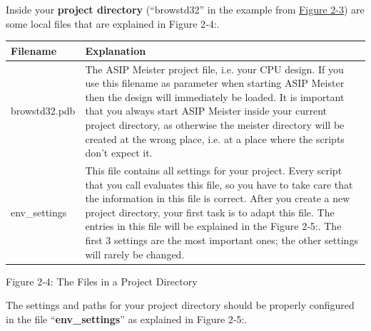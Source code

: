\documentclass[
]{article}
\begin{document}
Inside your \textbf{project directory} (``browstd32'' in the example
from \protect\hyperlink{Fig23}{Figure 2-3}) are some local files that
are explained in Figure 2‑4:.

\begin{longtable}[]{@{}ll@{}}
\toprule
\textbf{Filename} & \textbf{Explanation}\tabularnewline
\midrule
\endhead
browstd32.pdb & The ASIP Meister project file, i.e. your CPU design. If
you use this filename as parameter when starting ASIP Meister then the
design will immediately be loaded. It is important that you always start
ASIP Meister inside your current project directory, as otherwise the
meister directory will be created at the wrong place, i.e. at a place
where the scripts don't expect it.\tabularnewline
env\_settings & This file contains all settings for your project. Every
script that you call evaluates this file, so you have to take care that
the information in this file is correct. After you create a new project
directory, your first task is to adapt this file. The entries in this
file will be explained in the Figure 2‑5:. The first 3 settings are the
most important ones; the other settings will rarely be
changed.\tabularnewline
\bottomrule
\end{longtable}

Figure 2‑4: The Files in a Project Directory

The settings and paths for your project directory should be properly
configured in the file ``\textbf{env\_settings}'' as explained in Figure
2‑5:.
\end{document}

